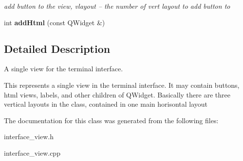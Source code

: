 \begin{CompactItemize}
\begin{CompactList}\small\item\em add button to the view, vlayout -- the number of vert layout to add button to \item\end{CompactList}\item 
\hypertarget{classinterface__view_019075445aa648d995d24806b2f6126e}{
int \textbf{addHtml} (const QWidget \&)}
\label{classinterface__view_019075445aa648d995d24806b2f6126e}

\end{CompactItemize}


\subsection{Detailed Description}
A single view for the terminal interface. 

This represents a single view in the terminal interface. It may contain buttons, html views, labels, and other children of QWidget. Basically there are three vertical layouts in the class, contained in one main horisontal layout 

The documentation for this class was generated from the following files:\begin{CompactItemize}
\item 
interface\_\-view.h\item 
interface\_\-view.cpp\end{CompactItemize}
